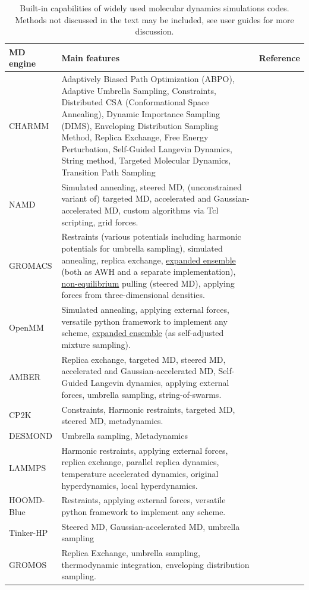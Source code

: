 \documentclass[9pt,review]{livecoms}
\begin{document}
\begin{table}[!ht]
\caption {Built-in capabilities of widely used molecular dynamics simulations codes. Methods not discussed in the text may be included, see user guides for more discussion.}
\label{Table:Codes}
\begin{tabularx}{0.95\textwidth}{
  || >{\raggedright\arraybackslash} l
  || >{\raggedright\arraybackslash}X
  | >{\raggedright\arraybackslash}l ||}
 \hline
  MD engine  & Main features                                 & Reference \\
\hline
\hline
CHARMM & Adaptively Biased Path Optimization (ABPO), Adaptive Umbrella Sampling, Constraints, Distributed CSA (Conformational Space Annealing), Dynamic Importance Sampling (DIMS), Enveloping Distribution Sampling Method, Replica Exchange, Free Energy Perturbation, Self-Guided Langevin Dynamics, String method, Targeted Molecular Dynamics, Transition Path Sampling & \cite{Brooks2009} \\
\hline
NAMD &  Simulated annealing, steered MD, (unconstrained variant of) targeted MD, accelerated and Gaussian-accelerated MD, custom algorithms via Tcl scripting, grid forces.        & \cite{Phillips2020} \\
\hline
GROMACS & Restraints (various potentials including harmonic potentials for umbrella sampling), simulated annealing, replica exchange, \hyperlink{ref:ExpEns} {expanded ensemble} (both as AWH and a separate implementation), \hyperlink{ref:OutOfEq} {non-equilibrium} pulling (steered MD), applying forces from three-dimensional densities.   &  \cite{lindahl_2021}\\
\hline
OpenMM & Simulated annealing, applying external forces, versatile python framework to implement any scheme, \hyperlink{ref:ExpEns}{expanded ensemble} (as self-adjusted mixture sampling). & \cite{10.1371/journal.pcbi.1005659}\\
\hline
AMBER  &  Replica exchange, targeted MD, steered MD, accelerated and Gaussian-accelerated MD, Self-Guided Langevin dynamics, applying external forces, umbrella sampling, string-of-swarms. & \cite{Case_2021} \\
\hline
CP2K & Constraints, Harmonic restraints, targeted MD, steered MD, metadynamics. & \cite{CP2K_2020} \\
\hline
DESMOND & Umbrella sampling, Metadynamics & \cite{Desmond2006} \\
\hline
LAMMPS  & Harmonic restraints, applying external forces, replica exchange, parallel replica dynamics, temperature accelerated dynamics, original hyperdynamics, local hyperdynamics. &  \cite{LAMMPS_2022}\\
\hline
HOOMD-Blue &  Restraints, applying external forces, versatile python framework to implement any scheme. & \cite{HOOMD-blue_2020} \\
\hline
Tinker-HP & Steered MD, Gaussian-accelerated MD, umbrella sampling & \cite{Celerse2019,Celerse2021} \\
\hline
GROMOS & Replica Exchange, umbrella sampling, thermodynamic integration, enveloping distribution sampling.  & \cite{Gromos_2012} \\
\hline
\end{tabularx}
\end{table}
\end{document}
